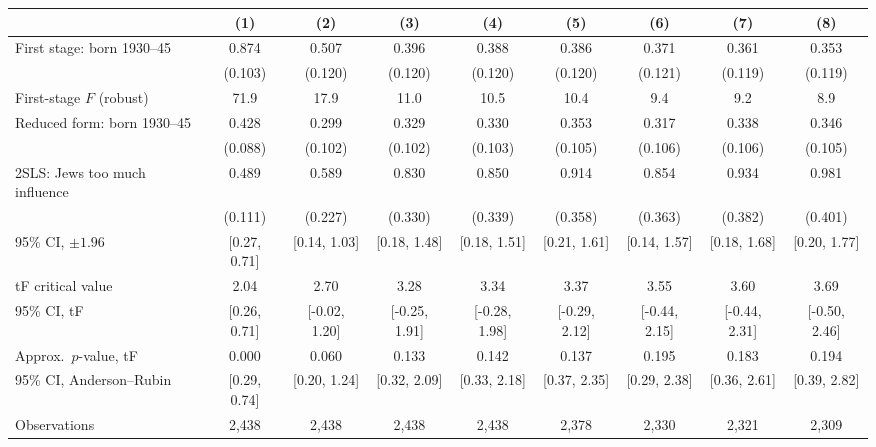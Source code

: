 \begin{tabular}{lcccccccc}
\toprule
 & (1) & (2) & (3) & (4) & (5) & (6) & (7) & (8) \\
\midrule
First stage: born 1930--45 & 0.874 & 0.507 & 0.396 & 0.388 & 0.386 & 0.371 & 0.361 & 0.353 \\
 & (0.103) & (0.120) & (0.120) & (0.120) & (0.120) & (0.121) & (0.119) & (0.119) \\
First-stage $F$ (robust) & 71.9 & 17.9 & 11.0 & 10.5 & 10.4 & 9.4 & 9.2 & 8.9 \\
Reduced form: born 1930--45 & 0.428 & 0.299 & 0.329 & 0.330 & 0.353 & 0.317 & 0.338 & 0.346 \\
 & (0.088) & (0.102) & (0.102) & (0.103) & (0.105) & (0.106) & (0.106) & (0.105) \\
\midrule
2SLS: Jews too much influence & 0.489 & 0.589 & 0.830 & 0.850 & 0.914 & 0.854 & 0.934 & 0.981 \\
 & (0.111) & (0.227) & (0.330) & (0.339) & (0.358) & (0.363) & (0.382) & (0.401) \\
95\% CI, $\pm 1.96$ & [0.27, 0.71] & [0.14, 1.03] & [0.18, 1.48] & [0.18, 1.51] & [0.21, 1.61] & [0.14, 1.57] & [0.18, 1.68] & [0.20, 1.77] \\
tF critical value & 2.04 & 2.70 & 3.28 & 3.34 & 3.37 & 3.55 & 3.60 & 3.69 \\
95\% CI, tF & [0.26, 0.71] & [-0.02, 1.20] & [-0.25, 1.91] & [-0.28, 1.98] & [-0.29, 2.12] & [-0.44, 2.15] & [-0.44, 2.31] & [-0.50, 2.46] \\
Approx.\ $p$-value, tF & 0.000 & 0.060 & 0.133 & 0.142 & 0.137 & 0.195 & 0.183 & 0.194 \\
95\% CI, Anderson--Rubin & [0.29, 0.74] & [0.20, 1.24] & [0.32, 2.09] & [0.33, 2.18] & [0.37, 2.35] & [0.29, 2.38] & [0.36, 2.61] & [0.39, 2.82] \\
\midrule
Observations & 2,438 & 2,438 & 2,438 & 2,438 & 2,378 & 2,330 & 2,321 & 2,309 \\
\bottomrule
\end{tabular}
